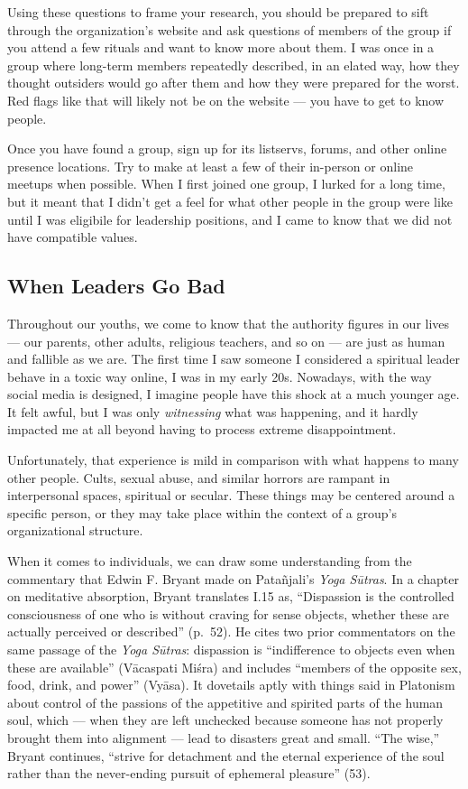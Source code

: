 \documentclass[
]{book}
\begin{document}
Using these questions to frame your research, you should be prepared to sift through the organization's website and ask questions of members of the group if you attend a few rituals and want to know more about them. I was once in a group where long-term members repeatedly described, in an elated way, how they thought outsiders would go after them and how they were prepared for the worst. Red flags like that will likely not be on the website --- you have to get to know people.

Once you have found a group, sign up for its listservs, forums, and other online presence locations. Try to make at least a few of their in-person or online meetups when possible. When I first joined one group, I lurked for a long time, but it meant that I didn't get a feel for what other people in the group were like until I was eligibile for leadership positions, and I came to know that we did not have compatible values.

\hypertarget{when-leaders-go-bad}{%
\subsection{When Leaders Go Bad}\label{when-leaders-go-bad}}

Throughout our youths, we come to know that the authority figures in our lives --- our parents, other adults, religious teachers, and so on --- are just as human and fallible as we are. The first time I saw someone I considered a spiritual leader behave in a toxic way online, I was in my early 20s. Nowadays, with the way social media is designed, I imagine people have this shock at a much younger age. It felt awful, but I was only \emph{witnessing} what was happening, and it hardly impacted me at all beyond having to process extreme disappointment.

Unfortunately, that experience is mild in comparison with what happens to many other people. Cults, sexual abuse, and similar horrors are rampant in interpersonal spaces, spiritual or secular. These things may be centered around a specific person, or they may take place within the context of a group's organizational structure.

When it comes to individuals, we can draw some understanding from the commentary that Edwin F. Bryant made on Patañjali's \emph{Yoga Sūtras}. In a chapter on meditative absorption, Bryant translates I.15 as, ``Dispassion is the controlled consciousness of one who is without craving for sense objects, whether these are actually perceived or described'' (p.~52). He cites two prior commentators on the same passage of the \emph{Yoga Sūtras}: dispassion is ``indifference to objects even when these are available'' (Vācaspati Miśra) and includes ``members of the opposite sex, food, drink, and power'' (Vyāsa). It dovetails aptly with things said in Platonism about control of the passions of the appetitive and spirited parts of the human soul, which --- when they are left unchecked because someone has not properly brought them into alignment --- lead to disasters great and small. ``The wise,'' Bryant continues, ``strive for detachment and the eternal experience of the soul rather than the never-ending pursuit of ephemeral pleasure'' (53).
\end{document}
